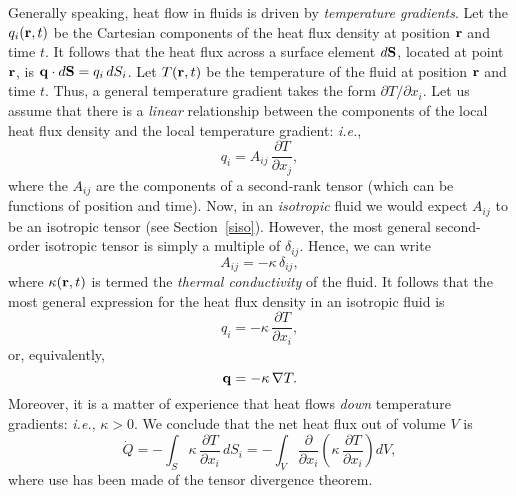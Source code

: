 Generally speaking, heat flow in fluids is driven by {\em temperature gradients}. Let the $q_i({\bf r},t)$ be the
Cartesian components of the heat flux density at position ${\bf r}$ and time $t$. It follows that the heat  flux
across a surface element $d{\bf S}$, located at point ${\bf r}$, is ${\bf q}\cdot d{\bf S} = q_i\,dS_i$. Let $T({\bf r},t)$ be
the  temperature of the fluid at position ${\bf r}$ and time $t$. Thus, a general temperature gradient takes the
form $\partial T/\partial x_i$.   Let us assume that there is a {\em linear}\/ relationship between the components of the local heat flux
density and the local temperature gradient: {\em i.e.},
\begin{equation}
q_i = A_{ij}\,\frac{\partial T}{\partial x_j},
\end{equation}
where the $A_{ij}$ are the components of a second-rank tensor (which can be functions of position and time). 
Now, in an {\em isotropic}\/ fluid we would expect $A_{ij}$ to be an isotropic tensor (see Section~\ref{siso}). 
However, the most general second-order isotropic tensor is  simply a multiple of $\delta_{ij}$. Hence, we can write
\begin{equation}
A_{ij} = -\kappa\,\delta_{ij},
\end{equation}
where $\kappa({\bf r},t)$  is termed the {\em thermal conductivity}\/ of the fluid. It follows that the most general
expression for the heat flux density in an isotropic  fluid is
\begin{equation}
q_i = -\kappa\,\frac{\partial T}{\partial x_i},
\end{equation}
or, equivalently, 
\begin{equation}\label{e4.68x}
{\bf q} = -\kappa\,\nabla T.
\end{equation}
Moreover, it is a matter of experience that heat flows {\em down}\/ temperature gradients: {\em i.e.}, $\kappa>0$. 
We conclude that the net heat flux out of volume $V$ is
\begin{equation}\label{e4.69}
\dot{Q} = -\int_S\kappa\,\frac{\partial T}{\partial x_i}\,dS_i = - \int_V\frac{\partial}{\partial x_i}\!\left(\kappa\,\frac{\partial T}{\partial x_i}\right) dV,
\end{equation}
where use has been made of the tensor divergence theorem.

